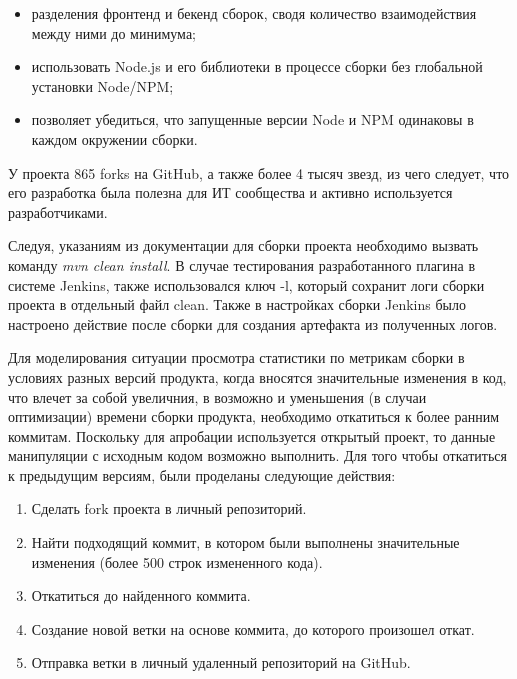 \begin{itemize}
	\item разделения фронтенд и бекенд сборок, сводя количество взаимодействия между ними до минимума;
	\item использовать Node.js и его библиотеки в процессе сборки без глобальной установки Node/NPM;
	\item позволяет убедиться, что запущенные версии Node и NPM одинаковы в каждом окружении сборки.
\end{itemize}

У проекта 865 forks на GitHub, а также более 4 тысяч звезд, из чего следует, что его разработка была полезна для ИТ сообщества и активно используется разработчиками.

Следуя, указаниям из документации для сборки проекта необходимо вызвать команду \textit{mvn clean install}. В случае тестирования разработанного плагина  в системе Jenkins, также использовался ключ -l, который сохранит логи сборки проекта в отдельный файл clean. Также в настройках сборки Jenkins было настроено действие после сборки для создания артефакта из полученных логов.

Для моделирования ситуации просмотра статистики по метрикам сборки в условиях разных версий продукта, когда вносятся значительные изменения в код, что влечет за собой увеличния, в возможно и уменьшения (в случаи оптимизации) времени сборки продукта, необходимо откатиться к более ранним коммитам. Поскольку для апробации используется открытый проект, то данные манипуляции с исходным кодом возможно выполнить. Для того чтобы откатиться к предыдущим версиям, были проделаны следующие действия:

\begin{enumerate}
	\item Сделать fork проекта в личный репозиторий.
	
	\item Найти подходящий коммит, в котором были выполнены значительные изменения (более 500 строк измененного кода).
	
	\item Откатиться до найденного коммита.
	
	\item Создание новой ветки на основе коммита, до которого произошел откат.
	
	\item Отправка ветки в личный удаленный репозиторий на GitHub.
	
\end{enumerate}

